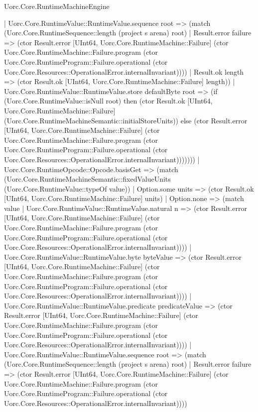 \begin{lexlean}{Uorc.Core.RuntimeMachineEngine}
\begin{semanticmodule}
{              | Uorc.Core.RuntimeValue::RuntimeValue.sequence root => (match (Uorc.Core.RuntimeSequence::length (project s arena) root)
                | Result.error failure => (ctor Result.error [UInt64, Uorc.Core.RuntimeMachine::Failure] (ctor Uorc.Core.RuntimeMachine::Failure.program (ctor Uorc.Core.RuntimeProgram::Failure.operational (ctor Uorc.Core.Resources::OperationalError.internalInvariant))))
                | Result.ok length => (ctor Result.ok [UInt64, Uorc.Core.RuntimeMachine::Failure] length))
              | Uorc.Core.RuntimeValue::RuntimeValue.store defaultByte root => (if (Uorc.Core.RuntimeValue::isNull root) then (ctor Result.ok [UInt64, Uorc.Core.RuntimeMachine::Failure] (Uorc.Core.RuntimeMachineSemantic::initialStoreUnits)) else (ctor Result.error [UInt64, Uorc.Core.RuntimeMachine::Failure] (ctor Uorc.Core.RuntimeMachine::Failure.program (ctor Uorc.Core.RuntimeProgram::Failure.operational (ctor Uorc.Core.Resources::OperationalError.internalInvariant)))))))
          | Uorc.Core.RuntimeOpcode::Opcode.basisGet => (match (Uorc.Core.RuntimeMachineSemantic::fixedValueUnits (Uorc.Core.RuntimeValue::typeOf value))
            | Option.some units => (ctor Result.ok [UInt64, Uorc.Core.RuntimeMachine::Failure] units)
            | Option.none => (match value
              | Uorc.Core.RuntimeValue::RuntimeValue.natural n => (ctor Result.error [UInt64, Uorc.Core.RuntimeMachine::Failure] (ctor Uorc.Core.RuntimeMachine::Failure.program (ctor Uorc.Core.RuntimeProgram::Failure.operational (ctor Uorc.Core.Resources::OperationalError.internalInvariant))))
              | Uorc.Core.RuntimeValue::RuntimeValue.byte byteValue => (ctor Result.error [UInt64, Uorc.Core.RuntimeMachine::Failure] (ctor Uorc.Core.RuntimeMachine::Failure.program (ctor Uorc.Core.RuntimeProgram::Failure.operational (ctor Uorc.Core.Resources::OperationalError.internalInvariant))))
              | Uorc.Core.RuntimeValue::RuntimeValue.predicate predicateValue => (ctor Result.error [UInt64, Uorc.Core.RuntimeMachine::Failure] (ctor Uorc.Core.RuntimeMachine::Failure.program (ctor Uorc.Core.RuntimeProgram::Failure.operational (ctor Uorc.Core.Resources::OperationalError.internalInvariant))))
              | Uorc.Core.RuntimeValue::RuntimeValue.sequence root => (match (Uorc.Core.RuntimeSequence::length (project s arena) root)
                | Result.error failure => (ctor Result.error [UInt64, Uorc.Core.RuntimeMachine::Failure] (ctor Uorc.Core.RuntimeMachine::Failure.program (ctor Uorc.Core.RuntimeProgram::Failure.operational (ctor Uorc.Core.Resources::OperationalError.internalInvariant))))
}
\end{semanticmodule}
\end{lexlean}
